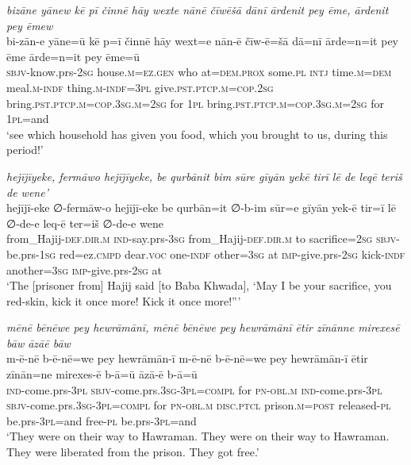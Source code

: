 \ea \label{BP.161}
\textit{bizāne yānew kē pī činnē hāy wexte nānē čīwēšā dānī ārdenit pey ēme, ārdenit pey ēmew} \\ 
\gll bi-zān-e yāne=ū kē p=ī činnē hāy wext=e nān-ē čīw-ē=šā dā=nī ārde=n=it pey ēme ārde=n=it pey ēme=ū \\ 
 \textsc{sbjv-}know.prs-\textsc{2sg} house\textsc{.m}\textsc{=ez.gen} who at=\textsc{dem.prox} some\textsc{.pl} \textsc{intj} time\textsc{.m}\textsc{=dem} meal\textsc{.m}\textsc{-indf} thing\textsc{.m}\textsc{-indf}\textsc{=3pl} give\textsc{.pst}\textsc{.ptcp}\textsc{.m}\textsc{=cop}\textsc{.\textsc{2sg}} bring\textsc{.pst}\textsc{.ptcp}\textsc{.m}\textsc{=cop}\textsc{.3sg}\textsc{.m}\textsc{=\textsc{2sg}} for \textsc{1pl} bring\textsc{.pst}\textsc{.ptcp}\textsc{.m}\textsc{=cop}\textsc{.3sg}\textsc{.m}\textsc{=\textsc{2sg}} for \textsc{1pl}=and \\ 
\glt `see which household has given you food, which you brought to us, during this period!'
\z 
 
\ea \label{BP.172}
\textit{hejījīyeke, fermāwo hejījīyeke, be qurbānit bim sūre gīyān yekē tirī lē de leqē teriš de wene’} \\ 
\gll hejījī-eke ∅-fermāw-o hejījī-eke be qurbān=it ∅-b-im sūr=e gīyān yek-ē tir=ī lē ∅-de-e leq-ē ter=iš ∅-de-e wene \\ 
 from\_Hajij\textsc{-def}\textsc{.dir}\textsc{.m} \textsc{ind-}say.prs\textsc{-3sg} from\_Hajij\textsc{-def}\textsc{.dir}\textsc{.m} to sacrifice\textsc{=\textsc{2sg}} \textsc{sbjv-}be.prs\textsc{-\textsc{1sg}} red=ez\textsc{.cmpd} dear.\textsc{voc} one\textsc{-indf} other\textsc{=3sg} at \textsc{imp-}give.prs-\textsc{2sg} kick\textsc{-indf} another\textsc{=3sg} \textsc{imp-}give.prs-\textsc{2sg} at \\ 
\glt `The [prisoner from] Hajij said [to Baba Khwada], ‘May I be your sacrifice, you red-skin, kick it once more! Kick it once more!”'
\z 
 
\ea \label{BP.179}
\textit{mēnē bēnēwe pey hewrāmānī, mēnē bēnēwe pey hewrāmānī ētir zīnānne mirexesē bāw āzāē bāw} \\ 
\gll m-ē-nē b-ē-nē=we pey hewrāmān-ī m-ē-nē b-ē-nē=we pey hewrāmān-ī ētir zīnān=ne mirexes-ē b-ā=ū āzā-ē b-ā=ū \\ 
 \textsc{ind-}come.prs\textsc{-3pl} \textsc{sbjv-}come.prs\textsc{.3sg}\textsc{-3pl}\textsc{=compl} for \textsc{pn}\textsc{-obl}\textsc{.m} \textsc{ind-}come.prs\textsc{-3pl} \textsc{sbjv-}come.prs\textsc{.3sg}\textsc{-3pl}\textsc{=compl} for \textsc{pn}\textsc{-obl}\textsc{.m} \textsc{disc.ptcl} prison\textsc{.m}\textsc{=\textsc{post}} released\textsc{\textsc{-pl}} be.prs\textsc{-3pl}=and free\textsc{\textsc{-pl}} be.prs\textsc{-3pl}=and \\ 
\glt `They were on their way to Hawraman. They were on their way to Hawraman. They were liberated from the prison. They got free.'
\z 
 

